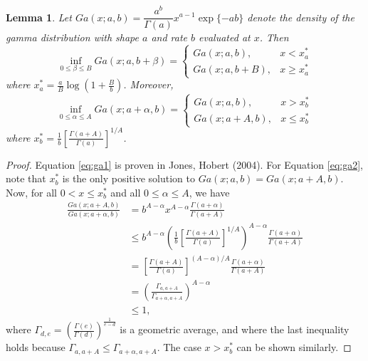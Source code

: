 \documentclass[11pt]{article}
\newtheorem{lemma}{Lemma}[section]
\begin{document}
	\begin{lemma}
		\label{pro:ga1}
		Let $Ga(x;a,b) = \dfrac{a^b}{\Gamma(a)}x^{a-1}\exp\{-ab\}$ denote the density of the gamma distribution with shape $a$ and rate $b$ evaluated at $x$. Then
		\begin{equation}
			\label{eq:ga1}
			\inf_{0\le \beta\le B} Ga(x;a,b+\beta) = 
			\begin{cases}
				Ga(x;a,b), & x<x_a^* \\ Ga(x;a,b+B), & x\ge x_a^*
			\end{cases}
		\end{equation}	
		where $x_a^*=\frac{a}{B}\log\left( 1+\frac{B}{b}\right) $. Moreover,
		\begin{equation}
			\label{eq:ga2}
			\inf_{0\le \alpha\le A} Ga(x;a+\alpha,b) = 
			\begin{cases}
				Ga(x;a,b), & x>x_b^* \\ Ga(x;a+A,b), & x\le x_b^*
			\end{cases}
		\end{equation}
		where $x_b^*=\frac{1}{b}\left[ \frac{\Gamma(a+A)}{\Gamma(a)}\right]^{1/A} $.
	\end{lemma}
	\begin{proof}
		Equation \ref{eq:ga1} is proven in Jones, Hobert (2004). For Equation \ref{eq:ga2}, note that $x_b^*$ is the only positive solution to $Ga(x;a,b) = Ga(x;a+A,b)$. Now, for all $0<x\le x_b^*$ and all $0\le\alpha\le A$, we have
		\begin{align*}
			\frac{Ga(x;a+A,b)}{Ga(x;a+\alpha,b)}
			& = b^{A-\alpha}x^{A-\alpha} \frac{\Gamma(a+\alpha)}{\Gamma(a+A)} \\
			& \le b^{A-\alpha}\left(\frac{1}{b}\left[ \frac{\Gamma(a+A)}{\Gamma(a)}\right]^{1/A} \right)^{A-\alpha} \frac{\Gamma(a+\alpha)}{\Gamma(a+A)} \\
			& = \left[ \frac{\Gamma(a+A)}{\Gamma(a)}\right]^{(A-\alpha)/A} \frac{\Gamma(a+\alpha)}{\Gamma(a+A)} \\
			& = \left( \frac{\Gamma_{a,a+A}}{\Gamma_{a+\alpha, a+A}}\right)^{A-\alpha} \\
			& \le 1,
		\end{align*}
		where $\Gamma_{d,e} = \left( \frac{\Gamma(e)}{\Gamma(d)} \right)^{\frac{1}{e-d}}$ is a geometric average,
		and where the last inequality holds because $\Gamma_{a,a+A}\le\Gamma_{a+\alpha, a+A}$.
		The case $x>x_b^*$ can be shown similarly.
	\end{proof}
	
\end{document}
